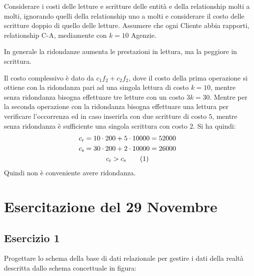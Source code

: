 \documentclass{article}
\numberwithin{equation}{subsection}
\newcommand{\tageq}{\tag{\stepcounter{equation}\theequation}}
\begin{document}
Considerare i costi delle letture e scritture delle entità e della relationship molti a molti, ignorando quelli della relationship uno a molti e 
considerare il costo delle scritture doppio di quello delle letture. Assumere che ogni Cliente abbia rapporti, relationship C-A, mediamente con $k=10$ Agenzie. 

In generale la ridondanze aumenta le prestazioni in lettura, ma la peggiore in scrittura. 

Il costo complessivo è dato da $c_1f_2+c_2f_2$, dove il costo della prima operazione si ottiene con la ridondanza pari ad una singola lettura di 
costo $k=10$, mentre senza ridondanza bisogna effettuare tre letture con un costo $3k=30$. 
Mentre per la seconda operazione con la ridondanza bisogna effettuare una lettura per verificare l'occorrenza ed in caso inserirla con due 
scritture di costo $5$, mentre senza ridondanza è sufficiente una singola scrittura con costo $2$. 
Si ha quindi:
\begin{gather*}
    c_{\mathrm{r}}=10\cdot200+5\cdot10000=52000\\
    c_{\mathrm{s}}=30\cdot200+2\cdot10000=26000\\
    c_{\mathrm{r}}>c_{\mathrm{s}}\tageq
\end{gather*}
Quindi non è conveniente avere ridondanza. 

\clearpage

\section{Esercitazione del 29 Novembre}

\subsection{Esercizio 1}

Progettare lo schema della base di dati relazionale per gestire i dati della realtà descritta dallo schema concettuale in figura:
\end{document}
